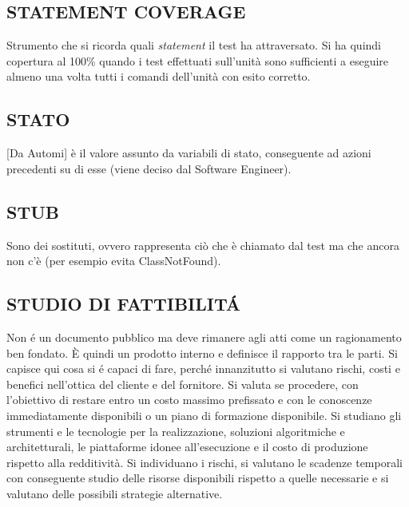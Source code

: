 		\subsection{STATEMENT COVERAGE}	\label{statementcoverage}	
		Strumento che si ricorda quali \textit{statement} il test ha attraversato. Si ha quindi copertura al 100\% quando i test effettuati sull'unità sono sufficienti a eseguire almeno una volta tutti i comandi dell'unità con esito corretto.
					
			
		\subsection{STATO}  \label{stato}
		[Da Automi] è il valore assunto da variabili di stato, conseguente ad azioni precedenti su di esse (viene deciso dal Software Engineer).
		
		\subsection{STUB}		\label{stub}
		Sono dei sostituti, ovvero rappresenta ciò che è chiamato dal test ma che ancora non c'è (per esempio evita ClassNotFound).
	
		\subsection{STUDIO DI FATTIBILITÁ}  \label{studiofattibilita}
		Non é un documento pubblico ma deve rimanere agli atti come un ragionamento ben fondato. È quindi un prodotto interno e definisce il rapporto tra le parti. Si capisce qui cosa si é capaci di fare, perché innanzitutto si valutano rischi, costi e benefici nell'ottica del cliente e del fornitore. Si valuta se procedere, con l’obiettivo di restare entro un costo massimo prefissato e con le conoscenze immediatamente disponibili o un piano di formazione disponibile. Si studiano gli strumenti e le tecnologie per la realizzazione, soluzioni algoritmiche e architetturali, le piattaforme idonee all'esecuzione e il costo di produzione rispetto alla redditività. Si individuano i rischi, si valutano le scadenze temporali con conseguente studio delle risorse disponibili rispetto a quelle necessarie e si valutano delle possibili strategie alternative.
	
	
